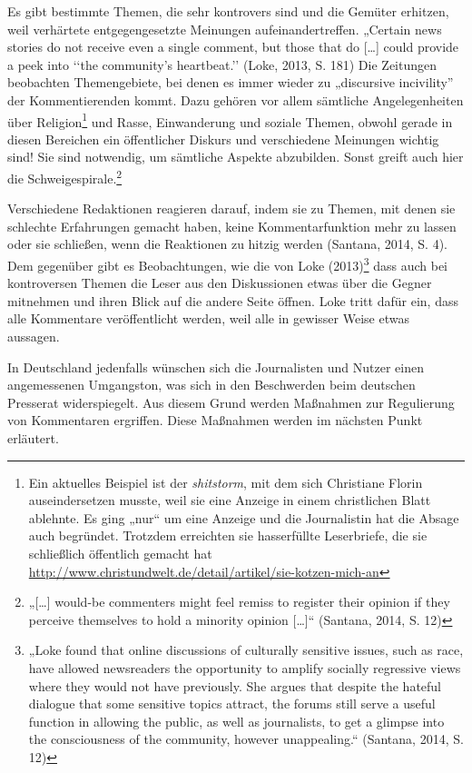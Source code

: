 \begin{enumerate}
Es gibt bestimmte Themen, die sehr kontrovers sind und die Gemüter erhitzen,
weil verhärtete entgegengesetzte Meinungen aufeinandertreffen.   „Certain news
stories do not receive even a single comment, but those that do [\ldots] could
provide a peek into ‘‘the community’s heartbeat.’’ (Loke, 2013, S. 181)
Die Zeitungen beobachten Themengebiete, bei denen es immer wieder zu „discursive
incivility” der Kommentierenden kommt. Dazu gehören vor allem sämtliche
Angelegenheiten über Religion\footnote{Ein aktuelles Beispiel ist der
{\slshape shitstorm}, mit dem sich Christiane Florin auseindersetzen musste, weil
sie eine Anzeige in einem christlichen Blatt ablehnte. Es ging „nur“ um eine
Anzeige und die Journalistin hat die Absage auch begründet. Trotzdem erreichten
sie hasserfüllte Leserbriefe, die sie schließlich öffentlich gemacht hat
\url{http://www.christundwelt.de/detail/artikel/sie-kotzen-mich-an}} und Rasse,
Einwanderung und soziale Themen, obwohl gerade in diesen Bereichen ein
öffentlicher Diskurs und verschiedene Meinungen wichtig sind! Sie sind
notwendig, um sämtliche Aspekte abzubilden. Sonst greift auch hier die
Schweigespirale.\footnote{„[\ldots] would-be commenters might feel remiss
to register their opinion if they perceive themselves to hold a minority opinion
[\ldots]“ (Santana, 2014, S. 12)}


Verschiedene Redaktionen reagieren darauf, indem sie zu Themen, mit denen sie
schlechte Erfahrungen gemacht haben, keine Kommentarfunktion mehr zu lassen oder
sie schließen, wenn die Reaktionen zu hitzig werden (Santana, 2014, S. 4). 
Dem gegenüber gibt es Beobachtungen, wie die von Loke (2013)\footnote{„Loke
found that online discussions of culturally sensitive issues, such as race, have
allowed newsreaders the opportunity to amplify socially regressive views where
they would not have previously. She argues that despite the hateful dialogue
that some sensitive topics attract, the forums still serve a useful function in
allowing the public, as well as journalists, to get a glimpse into the
consciousness of the community, however unappealing.“ (Santana, 2014, S. 12)}
dass auch bei kontroversen Themen die Leser aus den Diskussionen etwas über die
Gegner mitnehmen und ihren Blick auf die andere Seite öffnen. Loke tritt dafür
ein, dass alle Kommentare veröffentlicht werden, weil alle in gewisser Weise
etwas aussagen. 

In Deutschland jedenfalls wünschen sich die Journalisten und Nutzer einen
angemessenen Umgangston, was sich in den Beschwerden beim deutschen Presserat
widerspiegelt. Aus diesem Grund werden Maßnahmen zur Regulierung von Kommentaren
ergriffen. Diese Maßnahmen werden im nächsten Punkt erläutert.



\end{enumerate}
















